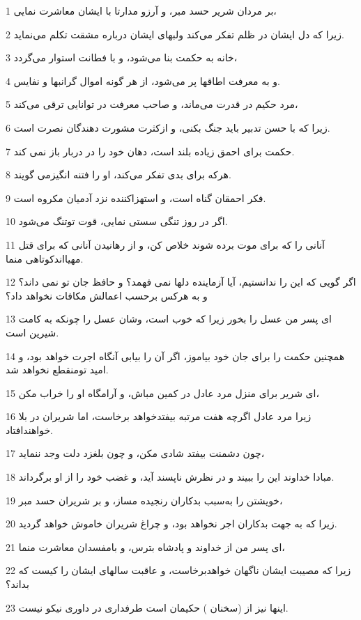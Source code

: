 \par 1 بر مردان شریر حسد مبر، و آرزو مدارتا با ایشان معاشرت نمایی،
\par 2 زیرا که دل ایشان در ظلم تفکر می‌کند ولبهای ایشان درباره مشقت تکلم می‌نماید.
\par 3 خانه به حکمت بنا می‌شود، و با فطانت استوار می‌گردد،
\par 4 و به معرفت اطاقها پر می‌شود، از هر گونه اموال گرانبها و نفایس.
\par 5 مرد حکیم در قدرت می‌ماند، و صاحب معرفت در توانایی ترقی می‌کند،
\par 6 زیرا که با حسن تدبیر باید جنگ بکنی، و ازکثرت مشورت دهندگان نصرت است.
\par 7 حکمت برای احمق زیاده بلند است، دهان خود را در دربار باز نمی کند.
\par 8 هر‌که برای بدی تفکر می‌کند، او را فتنه انگیزمی گویند.
\par 9 فکر احمقان گناه است، و استهزاکننده نزد آدمیان مکروه است.
\par 10 اگر در روز تنگی سستی نمایی، قوت توتنگ می‌شود.
\par 11 آنانی را که برای موت برده شوند خلاص کن، و از رهانیدن آنانی که برای قتل مهیااندکوتاهی منما.
\par 12 اگر گویی که این را ندانستیم، آیا آزماینده دلها نمی فهمد؟ و حافظ جان تو نمی داند؟ و به هرکس برحسب اعمالش مکافات نخواهد داد؟
\par 13 ‌ای پسر من عسل را بخور زیرا که خوب است، و‌شان عسل را چونکه به کامت شیرین است.
\par 14 همچنین حکمت را برای جان خود بیاموز، اگر آن را بیابی آنگاه اجرت خواهد بود، و امید تومنقطع نخواهد شد.
\par 15 ‌ای شریر برای منزل مرد عادل در کمین مباش، و آرامگاه او را خراب مکن،
\par 16 زیرا مرد عادل اگر‌چه هفت مرتبه بیفتدخواهد برخاست، اما شریران در بلا خواهندافتاد.
\par 17 چون دشمنت بیفتد شادی مکن، و چون بلغزد دلت وجد ننماید،
\par 18 مبادا خداوند این را ببیند و در نظرش ناپسند آید، و غضب خود را از او برگرداند.
\par 19 خویشتن را به‌سبب بدکاران رنجیده مساز، و بر شریران حسد مبر،
\par 20 زیرا که به جهت بدکاران اجر نخواهد بود، و چراغ شریران خاموش خواهد گردید.
\par 21 ‌ای پسر من از خداوند و پادشاه بترس، و بامفسدان معاشرت منما،
\par 22 زیرا که مصیبت ایشان ناگهان خواهدبرخاست، و عاقبت سالهای ایشان را کیست که بداند؟
\par 23 اینها نیز از (سخنان ) حکیمان است طرفداری در داوری نیکو نیست.
